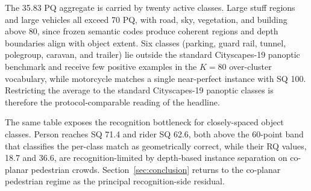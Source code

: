 \documentclass{article}
\begin{document}
\begin{table}[!htbp]
\caption{Per-class Cityscapes validation PQ, SQ, and RQ for the final trained network. Values are percentages.}
\label{tab:perclass}
\centering
\small
\setlength{\tabcolsep}{6pt}
\end{table}

The 35.83 PQ aggregate is carried by twenty active classes. Large stuff regions and large vehicles all exceed 70 PQ, with road, sky, vegetation, and building above 80, since frozen semantic codes produce coherent regions and depth boundaries align with object extent. Six classes (parking, guard rail, tunnel, polegroup, caravan, and trailer) lie outside the standard Cityscapes-19 panoptic benchmark and receive few positive examples in the $K{=}80$ over-cluster vocabulary, while motorcycle matches a single near-perfect instance with SQ 100. Restricting the average to the standard Cityscapes-19 panoptic classes is therefore the protocol-comparable reading of the headline.

The same table exposes the recognition bottleneck for closely-spaced object classes. Person reaches SQ 71.4 and rider SQ 62.6, both above the 60-point band that classifies the per-class match as geometrically correct, while their RQ values, 18.7 and 36.6, are recognition-limited by depth-based instance separation on co-planar pedestrian crowds. Section~\ref{sec:conclusion} returns to the co-planar pedestrian regime as the principal recognition-side residual.
\end{document}
